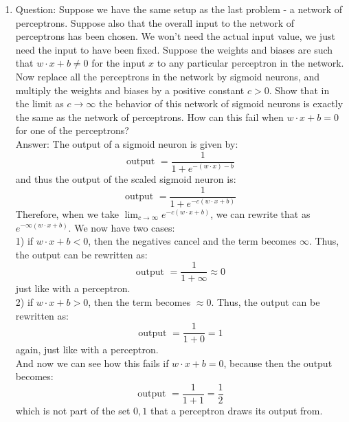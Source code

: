 \documentclass{article}
\begin{document}
\begin{enumerate}
		\item
			Question: Suppose we have the same setup as the last problem - a network of perceptrons. Suppose also that the overall input to the network of perceptrons has been chosen. We won't need the actual input value, we just need the input to have been fixed. Suppose the weights and biases are such that $w\cdot x+b \neq 0$ for the input $x$ to any particular perceptron in the network. Now replace all the perceptrons in the network by sigmoid neurons, and multiply the weights and biases by a positive constant $c>0$. Show that in the limit as $c \rightarrow \infty$ the behavior of this network of sigmoid neurons is exactly the same as the network of perceptrons. How can this fail when $w\cdot x+b=0$ for one of the perceptrons? \\
			Answer: The output of a sigmoid neuron is given by: \\
			\begin{equation*}
				\text{output } = \frac{1}{1 + e^{- (w \cdot x) - b}}
			\end{equation*}
			and thus the output of the scaled sigmoid neuron is:
			\begin{equation*}
				\text{output } = \frac{1}{1 + e^{-c(w \cdot x + b)}}
			\end{equation*}
			Therefore, when we take $\lim_{c \to \infty} e^{-c(w \cdot x + b)}$, we can rewrite that as $e^{-\infty (w \cdot x + b)}$. We now have two cases: \\
			1) if $w \cdot x + b < 0$, then the negatives cancel and the term becomes $\infty$. Thus, the output can be rewritten as: 
			\begin{equation*}
				\text{output } = \frac{1}{1 + \infty} \approx 0
			\end{equation*}
			just like with a perceptron. \\
			2) if $w \cdot x + b > 0$, then the term becomes $\approx 0$. Thus, the output can be rewritten as: 
			\begin{equation*}
				\text{output } = \frac{1}{1 + 0} = 1
			\end{equation*}
			again, just like with a perceptron. \\
			And now we can see how this fails if $w \cdot x + b = 0$, because then the output becomes:
			\begin{equation*}
				\text{output } = \frac{1}{1 + 1} = \frac{1}{2}
			\end{equation*}
			which is not part of the set ${0, 1}$ that a perceptron draws its output from.
		\end{enumerate}
\end{document}
